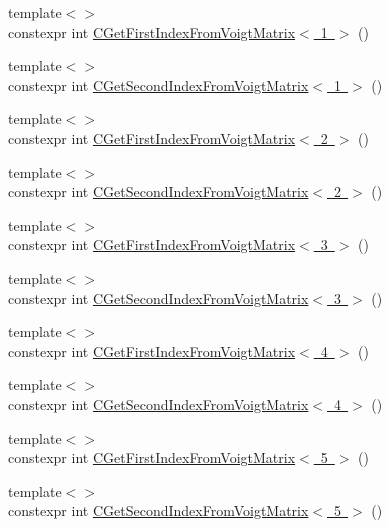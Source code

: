 \begin{DoxyCompactItemize}
\item 
{\footnotesize template$<$$>$ }\\constexpr int \mbox{\hyperlink{namespacempc_1_1utilities_a9d279abaf7dfef3e9192f7b778eb68fa}{C\+Get\+First\+Index\+From\+Voigt\+Matrix$<$ 1 $>$}} ()
\item 
{\footnotesize template$<$$>$ }\\constexpr int \mbox{\hyperlink{namespacempc_1_1utilities_ac600a3a4e8be50854214d495b7672444}{C\+Get\+Second\+Index\+From\+Voigt\+Matrix$<$ 1 $>$}} ()
\item 
{\footnotesize template$<$$>$ }\\constexpr int \mbox{\hyperlink{namespacempc_1_1utilities_a9c173e2ecba984e738a4a21047fc78f7}{C\+Get\+First\+Index\+From\+Voigt\+Matrix$<$ 2 $>$}} ()
\item 
{\footnotesize template$<$$>$ }\\constexpr int \mbox{\hyperlink{namespacempc_1_1utilities_ace2b5aa12b0c53dfb13b277172f636d3}{C\+Get\+Second\+Index\+From\+Voigt\+Matrix$<$ 2 $>$}} ()
\item 
{\footnotesize template$<$$>$ }\\constexpr int \mbox{\hyperlink{namespacempc_1_1utilities_a80545c6ddda43d5f72754d0f18ec42fc}{C\+Get\+First\+Index\+From\+Voigt\+Matrix$<$ 3 $>$}} ()
\item 
{\footnotesize template$<$$>$ }\\constexpr int \mbox{\hyperlink{namespacempc_1_1utilities_a1ab261832775728a8dd9aec99a9b8255}{C\+Get\+Second\+Index\+From\+Voigt\+Matrix$<$ 3 $>$}} ()
\item 
{\footnotesize template$<$$>$ }\\constexpr int \mbox{\hyperlink{namespacempc_1_1utilities_a9cc9cf00e8b46c7b4089290a9801dab8}{C\+Get\+First\+Index\+From\+Voigt\+Matrix$<$ 4 $>$}} ()
\item 
{\footnotesize template$<$$>$ }\\constexpr int \mbox{\hyperlink{namespacempc_1_1utilities_a2e002bb3ea9c528659336d38b86cbaf8}{C\+Get\+Second\+Index\+From\+Voigt\+Matrix$<$ 4 $>$}} ()
\item 
{\footnotesize template$<$$>$ }\\constexpr int \mbox{\hyperlink{namespacempc_1_1utilities_a84defb8639ca919a8620092ce15ffd4c}{C\+Get\+First\+Index\+From\+Voigt\+Matrix$<$ 5 $>$}} ()
\item 
{\footnotesize template$<$$>$ }\\constexpr int \mbox{\hyperlink{namespacempc_1_1utilities_a070e4f2163645cfbe7e03651d594016e}{C\+Get\+Second\+Index\+From\+Voigt\+Matrix$<$ 5 $>$}} ()

\end{DoxyCompactItemize}

